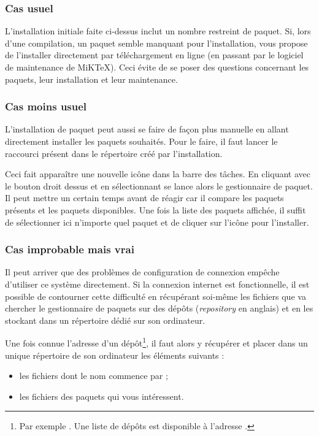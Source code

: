 \subsubsection{Cas usuel}

L'installation initiale faite ci-dessus inclut un nombre restreint de paquet. Si, lors d'une compilation, un paquet semble manquant pour l'installation,  vous propose de l'installer directement par téléchargement en ligne (en passant par le logiciel de maintenance de MiK\TeX). Ceci évite de se poser des questions concernant les paquets, leur installation et leur maintenance. 

\subsubsection{Cas moins usuel}

L'installation de paquet peut aussi se faire de façon plus manuelle en allant directement installer les paquets souhaités. Pour le faire, il faut lancer le raccourci  présent dans le répertoire créé par l'installation. 

Ceci fait apparaître une nouvelle icône dans la barre des tâches. En cliquant avec le bouton droit dessus et en sélectionnant  se lance alors le gestionnaire de paquet. Il peut mettre un certain temps avant de réagir car il compare les paquets présents et les paquets disponibles. Une fois la liste des paquets affichée, il suffit de sélectionner ici n'importe quel paquet et de cliquer sur l'icône \vue{+} pour l'installer.

\subsubsection{Cas improbable mais vrai}

Il peut arriver que des problèmes de configuration de connexion empêche d'utiliser ce système directement. Si la connexion internet est fonctionnelle, il est possible de contourner cette difficulté en récupérant soi-même les fichiers que va chercher le gestionnaire de paquets sur des dépôts (\emph{repository} en anglais) et en les stockant dans un répertoire dédié sur son ordinateur. 

Une fois connue l'adresse d'un dépôt\footnote{Par exemple . Une liste de dépôts est disponible à l'adresse .}, il faut alors y récupérer et placer dans un unique répertoire de son ordinateur les éléments suivants :
\begin{itemize}
\item les fichiers dont le nom commence par  ;
\item les fichiers des paquets qui vous intéressent.
\end{itemize}


